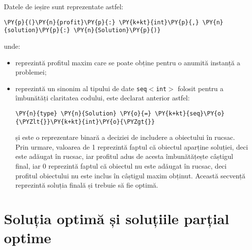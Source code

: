 \begin{sloppypar}
Datele de ieșire sunt reprezentate astfel:
\begin{Verbatim}[commandchars=\\\{\}]
                \PY{p}{(}\PY{n}{profit}\PY{p}{:} \PY{k+kt}{int}\PY{p}{,} \PY{n}{solution}\PY{p}{:} \PY{n}{Solution}\PY{p}{)}
\end{Verbatim}
unde:
\begin{itemize}
    \item {} reprezintă profitul maxim care se poate obține pentru o anumită instanță a problemei;
    \item {} reprezintă un sinonim al tipului de date \texttt{seq\(<\)int\(>\)} folosit pentru a îmbunătăți claritatea codului, este declarat anterior astfel:
\begin{Verbatim}[commandchars=\\\{\}]
                \PY{n}{type} \PY{n}{Solution} \PY{o}{=} \PY{k+kt}{seq}\PY{o}{\PYZlt{}}\PY{k+kt}{int}\PY{o}{\PYZgt{}}
\end{Verbatim}
și este o reprezentare binară a deciziei de includere a obiectului în rucsac. Prin urmare, valoarea de 1 reprezintă faptul că obiectul aparține soluției, deci este adăugat în rucsac, iar profitul adus de acesta îmbunătățește câștigul final, iar 0 reprezintă faptul că obiectul nu este adăugat în rucsac, deci profitul obiectului nu este inclus în câștigul maxim obținut. Această secvență reprezintă soluția finală și trebuie să fie optimă.
\end{itemize} 

\section{Soluția optimă și soluțiile parțial optime}


\end{sloppypar}
